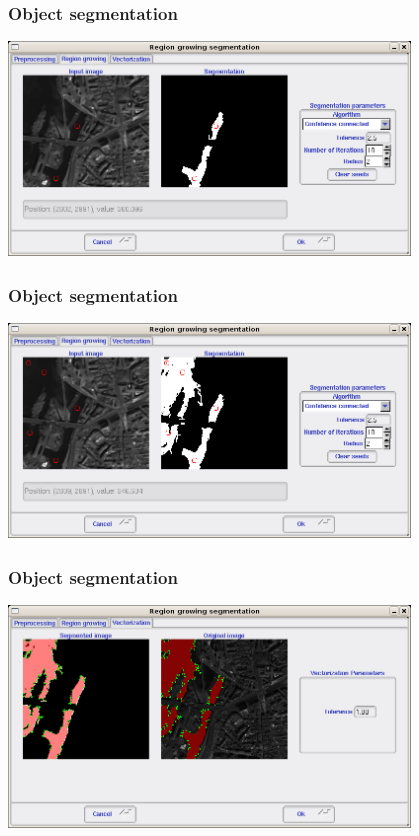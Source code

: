 \documentclass[compress]{beamer}
\begin{document}
\begin{frame}
  \frametitle{Object segmentation}
      \begin{center}
      \includegraphics[width=0.80\textwidth]{Images/seg4.png}
  \end{center}
\end{frame}

\begin{frame}
  \frametitle{Object segmentation}
      \begin{center}
      \includegraphics[width=0.80\textwidth]{Images/seg5.png}
  \end{center}
\end{frame}

\begin{frame}
  \frametitle{Object segmentation}
      \begin{center}
      \includegraphics[width=0.80\textwidth]{Images/seg6.png}
  \end{center}
\end{frame}
\end{document}
